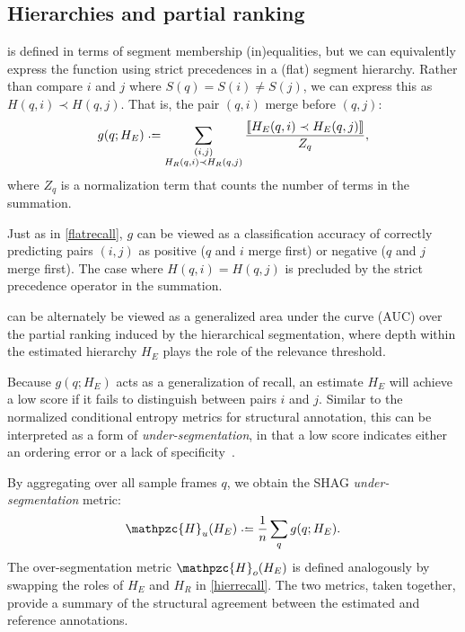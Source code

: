 \documentclass{article}
\def\shag{\ensuremath{\mathpzc{H}}}
\begin{document}
\subsection{Hierarchies and partial ranking}

 is defined in terms of segment membership (in)equalities, but 
we can equivalently express the function using strict precedences in a (flat)
segment hierarchy.
Rather than compare $i$ and $j$ where $S(q) = S(i) \neq S(j)$, we can express this as $H(q, i) \prec H(q, j)$.
That is, the pair $(q,i)$ merge before $(q,j)$:
\begin{equation}
g(q ; H_E) \defeq \sum_{\substack{(i, j)\\ H_R(q, i) \prec H_R(q, j)}}
\frac{\ind{H_E(q, i) \prec H_E(q, j)}}{Z_q},\label{hierrecall}
\end{equation}
where $Z_q$ is a normalization term that counts the number of terms in the summation.

Just as in \cref{flatrecall}, $g$ can be viewed as a classification accuracy of
correctly predicting pairs $(i, j)$ as positive ($q$ and $i$ merge first) or negative
($q$ and $j$ merge first).  The case where $H(q, i) = H(q, j)$ is precluded by the
strict precedence operator in the summation.

 can be alternately be viewed as a generalized area under the curve
(AUC) over the partial ranking induced by the hierarchical segmentation, where depth 
within the estimated hierarchy $H_E$ plays the role of the relevance threshold.

Because $g(q; H_E)$ acts as a generalization of recall, an estimate $H_E$ will achieve 
a low score if it fails to distinguish between pairs $i$ and $j$.  Similar to the 
normalized conditional entropy metrics for structural annotation, this can be interpreted 
as a form of \emph{under-segmentation}, in that a low score indicates either an ordering 
error or a lack of specificity~\cite{Lukashevich2008}.  

By aggregating over all sample frames $q$, we obtain the SHAG \emph{under-segmentation} metric:
\begin{equation}
\shag_u(H_E) \defeq \frac{1}{n} \sum_q g(q ; H_E).
\end{equation}
The over-segmentation metric $\shag_o(H_E)$ is defined analogously by swapping the roles of $H_E$ and $H_R$ in \cref{hierrecall}.
The two metrics, taken together, provide a summary of the structural agreement between the estimated and reference annotations.
\end{document}
